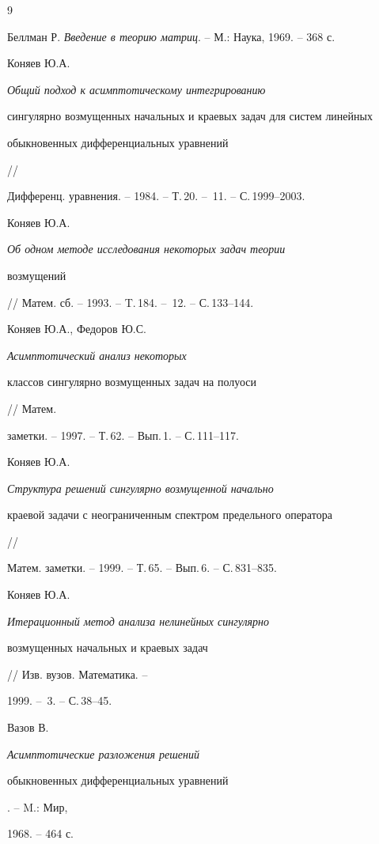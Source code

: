 \begin{thebibliography}{9} 


 




Беллман Р. {\em Введение в теорию матриц}. -- М.: Наука, 1969. -- 368 с. 




Коняев Ю.А. {\em Общий подход к асимптотическому интегрированию 


сингулярно возмущенных начальных и краевых задач для систем линейных 


обыкновенных дифференциальных уравнений} // 


Дифференц. уравнения. -- 1984. -- Т.\,20. -- \No\,11. -- С.\,1999--2003. 




Коняев Ю.А. {\em Об одном методе исследования некоторых задач теории 


возмущений} // Матем. сб. -- 1993. -- T.\,184. -- \No\,12. -- С.\,133--144. 




Коняев Ю.А., Федоров Ю.С. {\em Асимптотический анализ некоторых 


классов сингулярно возмущенных задач на полуоси} // Матем. 


заметки. -- 1997. -- Т.\,62. -- Вып.\,1. -- С.\,111--117. 




Коняев Ю.А. {\em Структура решений сингулярно возмущенной начально 


краевой задачи с неограниченным спектром предельного оператора} // 


Матем. заметки. -- 1999. -- Т.\,65. -- Вып.\,6. -- С.\,831--835. 




Коняев Ю.А. {\em Итерационный метод анализа нелинейных сингулярно 


возмущенных начальных и краевых задач} // Изв. вузов. Математика. -- 


1999. -- \No\,3. -- С.\,38--45. 




Вазов В. {\em Асимптотические разложения решений 


обыкновенных дифференциальных уравнений}. -- M.: Мир, 


1968. -- 464 с. 


 


\end{thebibliography} 


 


\vskip 2cm 


 






 


\label{end} 


 


